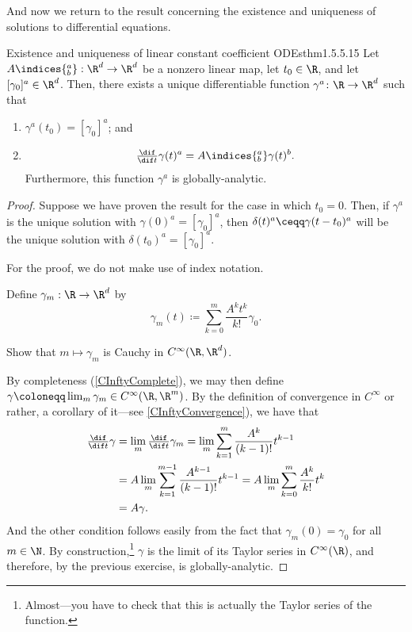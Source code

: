 And now we return to the result concerning the existence and uniqueness of solutions to differential equations.
\begin{thm}{Existence and uniqueness of linear constant coefficient ODEs}{thm1.5.5.15}
Let $A\indices{^a_b}:\R ^d\rightarrow \R ^d$ be a nonzero linear map, let $t_0\in \R$, and let $[\gamma _0]^a\in \R ^d$.  Then, there exists a unique differentiable function $\gamma ^a\colon \R \rightarrow \R ^d$ such that
\begin{enumerate}
\item $\gamma ^a(t_0)=[\gamma _0]^a$; and
\item
\begin{equation}
\tfrac{\dif}{\dif t}\gamma (t)^a=A\indices{^a_b}\gamma (t)^b.
\end{equation}
Furthermore, this function $\gamma ^a$ is globally-analytic.
\end{enumerate}
\begin{proof}
Suppose we have proven the result for the case in which $t_0=0$.  Then, if $\gamma ^a$ is the unique solution with $\gamma (0)^a=[\gamma _0]^a$, then $\delta (t)^a\ceqq \gamma (t-t_0)^a$ will be the unique solution with $\delta (t_0)^a=[\gamma _0]^a$.

For the proof, we do not make use of index notation.

Define $\gamma _m:\R \rightarrow \R ^d$ by
\begin{equation}
\gamma _m(t)\coloneqq \sum _{k=0}^m\frac{A^kt^k}{k!}\gamma _0.
\end{equation}
\begin{exr}[breakable=false]{}{}
Show that $m\mapsto \gamma _m$ is Cauchy in $C^\infty (\R ,\R ^d)$.
\end{exr}
By completeness (\cref{CInftyComplete}), we may then define $\gamma \coloneqq \lim _m\gamma _m\in C^\infty (\R ,\R ^m)$.  By the definition of convergence in $C^\infty$ or rather, a corollary of it---see \cref{CInftyConvergence}), we have that
\begin{equation}
\begin{split}
\tfrac{\dif}{\dif t}\gamma & =\lim _m\tfrac{\dif}{\dif t}\gamma _m=\lim _m\sum _{k=1}^m\frac{A^k}{(k-1)!}t^{k-1} \\
& =A\lim _m\sum _{k=1}^{m-1}\frac{A^{k-1}}{(k-1)!}t^{k-1}=A\lim _m\sum _{k=0}^m\frac{A^k}{k!}t^k \\
& =A\gamma .
\end{split}
\end{equation}
And the other condition follows easily from the fact that $\gamma _m(0)=\gamma _0$ for all $m\in \N$.  By construction,\footnote{Almost---you have to check that this is actually the Taylor series of the function.} $\gamma$ is the limit of its Taylor series in $C^\infty (\R )$, and therefore, by the previous exercise, is globally-analytic.


\end{proof}
\end{thm}
